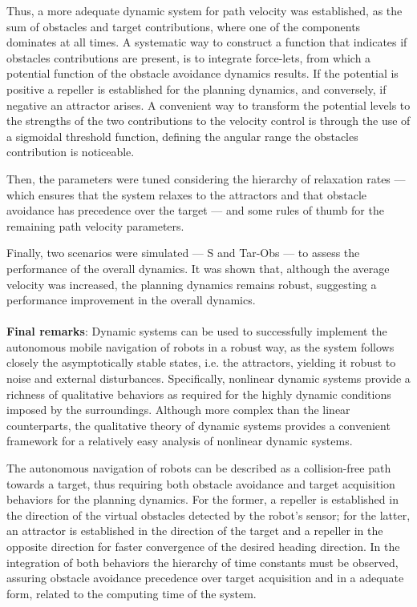 Thus, a more adequate dynamic system for path velocity was
established, as the sum of obstacles and target contributions, where one of the
components dominates at all times. A systematic way to construct a
function that indicates if obstacles contributions are present, is to integrate
force-lets, from which a potential function of the obstacle avoidance dynamics
results. If the potential is positive a repeller is established for the planning
dynamics, and conversely, if negative an attractor arises. A convenient way 
to transform the potential levels to the strengths of the two contributions
to the velocity control is through the use of a sigmoidal threshold function,
defining the angular range the obstacles contribution is noticeable.

Then, the parameters were tuned considering the hierarchy of relaxation rates
--- which ensures that the system relaxes to the attractors and that obstacle
avoidance has precedence over the target --- and some rules of thumb for the
remaining path velocity parameters.

Finally, two scenarios were simulated --- S and Tar-Obs --- to assess the
performance of the overall dynamics. It was shown that, although the average
velocity was increased, the planning dynamics remains robust, suggesting a performance improvement in the overall dynamics.
%
\\\\
\textbf{Final remarks}:
Dynamic systems can be used to successfully implement the autonomous mobile
navigation of robots in a robust way, as the system follows closely the
asymptotically stable states, i.e. the attractors, yielding it robust to noise
and external disturbances. Specifically, nonlinear dynamic systems provide a
richness of qualitative behaviors as required for the highly dynamic conditions
imposed by the surroundings. Although more complex than the linear counterparts,
the qualitative theory of dynamic systems provides a convenient framework for a
relatively easy analysis of nonlinear dynamic systems.

The autonomous navigation of robots can be described as a collision-free path
towards a target, thus requiring both obstacle avoidance and target acquisition
behaviors for the planning dynamics. For the former, a repeller is established in the direction of the
virtual obstacles detected by the robot's sensor; for the latter, an attractor
is established in the direction of the target and a repeller in the opposite
direction for faster convergence of the desired heading direction. In the
integration of both behaviors the hierarchy of time constants must be observed,
assuring obstacle avoidance precedence over target acquisition and in a adequate
form, related to the computing time of the system.

